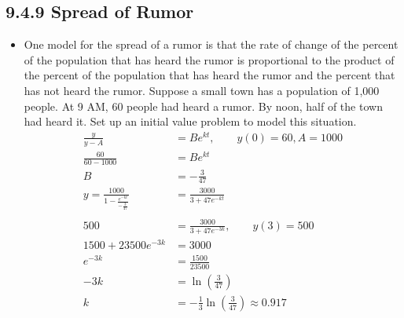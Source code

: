 \begin{itemize}
  \subsection{9.4.9 Spread of Rumor}
  \begin{itemize}
    \item One model for the spread of a rumor is that the rate of change of the
      percent of the population that has heard the rumor is proportional to the
      product of the percent  of the population that has heard the rumor and
      the percent that has not heard the rumor. Suppose a small town has a population of 1,000 people. At 9 AM, 60
      people had heard a rumor. By noon, half of the town had heard it. Set up
      an initial value problem to model this situation.
      \begin{align*}
        \frac{y}{y-A} &= Be^{kt},\qquad y(0) = 60, A = 1000\\
        \frac{60}{60-1000} &= Be^{kt}\\
        B &= -\frac{3}{47} \\
        y = \frac{1000}{1-\frac{e^{-kt}}{-\frac{3}{47}}} &= \frac{3000}{3+47e^{-kt}}\\\\
        500 &= \frac{3000}{3+47e^{-3k}}, \qquad y(3) = 500 \\
        1500 + 23500e^{-3k} &= 3000  \\
        e^{-3k} &= \frac{1500}{23500} \\
        -3k &= \ln\left( \frac{3}{47} \right) \\
        k &= -\frac{1}{3}\ln \left( \frac{3}{47} \right)
        \approx 0.917\\
      \end{align*}
  \end{itemize}

\end{itemize}
